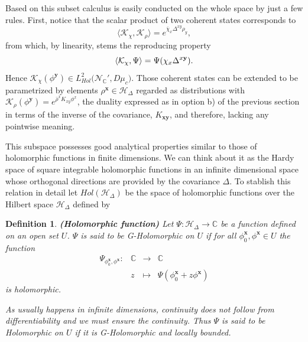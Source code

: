 \documentclass[12pt]{article}%
\newtheorem{definition}{Definition}%
\begin{document}
Based on this subset calculus is easily conducted on the whole space by just a few rules.  First, notice that
the scalar product of two coherent states corresponds to
\begin{equation*}
    \langle \mathcal{K}_{\chi},\mathcal{K}_{\rho}\rangle = e^{{\bar{\chi}_x\Delta^{xy}\rho_y}},
\end{equation*}
from which, by linearity, stems the reproducing property
\begin{equation*}
    \langle \mathcal{K}_{\chi},\Psi\rangle= \Psi(\chi_{x}\Delta^{x \mathbf{y}}). \\
\end{equation*}
 Hence $ \mathcal{K}_{\chi}(\phi^{\mathbf{y}})\in L^2_{Hol}\big({\mathcal{N}_{\mathbb{C}}'},D\mu_c\big)$. Those coherent states can be extended to be parametrized by elements $\rho^{\mathbf{x}}\in \mathcal{H}_\Delta$ regarded as distributions with $ \mathcal{K}_\rho(\phi^{\mathbf{y}})=e^{\bar\rho^xK_{xy}\phi^x}$, the duality expressed as in option b) of the previous section in terms of the inverse of the covariance, $K_{\mathbf{xy}}$, and therefore, lacking any pointwise meaning. 
 
 
 This subspace possesses good analytical properties similar to those of holomorphic functions in finite dimensions. We can think about it as the Hardy space of square integrable holomorphic functions  in an infinite dimensional space whose orthogonal directions are provided by the covariance $\Delta$. To stablish this relation in detail let $Hol(\mathcal{H}_\Delta)$ be the space of holomorphic functions over the Hilbert space $\mathcal{H}_\Delta$ defined by

\begin{definition}
    \label{def:Holomorphic}{\bf (Holomorphic function)}
    Let $\Psi:\mathcal{H}_\Delta\to\mathbb{C}$ be a function defined on an open set $U$. $\Psi$ is said to be G-Holomorphic on $U$ if for all $\phi^\mathbf{x}_0,\phi^\mathbf{x}\in U$ the function
    \begin{equation}
    \label{eq:complexSubfunctionGateaux}
    \begin{array}{rccc}
        \Psi_{\phi^\mathbf{x}_0,\phi^\mathbf{x}}:&\mathbb{C}&\longrightarrow&\mathbb{C}\\
         & z & \longmapsto & \Psi(\phi^\mathbf{x}_0+z\phi^\mathbf{x})
    \end{array}
    \end{equation} 
    is holomorphic. 

    As usually happens in infinite dimensions, continuity does not follow from differentiability and we must ensure the continuity. Thus $\Psi$ is said to be Holomorphic on $U$ if it is G-Holomorphic and locally bounded.
    \end{definition}
    
\end{document}
